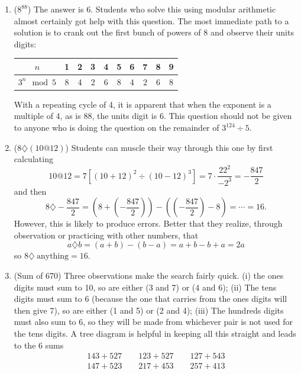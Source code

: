 {\begin{enumerate}
		\item ($8^{88}$) The answer is 6. Students who solve this using modular arithmetic almost certainly got help with this question. The most immediate path to a solution is to crank out the first bunch of powers of 8 and observe their units digits:
		\begin{center}
			\begin{tabular}{|c|c|c|c|c|c|c|c|c|c|}
				\hline
				$n$				& 1 & 2 & 3 & 4 & 5 & 6 & 7 & 8 & 9 \tabularnewline
				\hline
				$3^n \mod 5$ 	& 8 & 4 & 2 & 6 & 8 & 4 & 2 & 6 & 8\tabularnewline
				\hline
			\end{tabular}\par
		\end{center}
		With a repeating cycle of 4, it is apparent that when the exponent is a multiple of 4, as is $88$, the units digit is 6. This question should not be given to anyone who is doing the question on the remainder of $3^{124}\div 5$.
		
		\item ($8\diamondsuit(10@12)$) Students can muscle their way through this one by first calculating
		$$10@12=7[(10+12)^2\div (10-12)^3]=7\cdot\frac{22^2}{-2^3}=-\frac{847}{2}$$
		and then
		$$8\diamondsuit -\frac{847}{2}=\left(8+ \left(-\frac{847}{2}\right)\right)-\left(\left(-\frac{847}{2}\right)-8\right)=\cdots=16.$$
		However, this is likely to produce errors. Better that they realize, through observation or practicing with other numbers, that
		$$a\diamondsuit b=(a+b)-(b-a)=a+b-b+a=2a$$
		so $8\diamondsuit\ \textrm{anything}=16.$
		
		\item (Sum of 670) Three observations make the search fairly quick. (i) the ones digits must sum to 10, so are either (3 and 7) or (4 and 6); (ii) The tens digits must sum to 6 (because the one that carries from the ones digits will then give 7), so are either (1 and 5) or (2 and 4); (iii) The hundreds digits must also sum to 6, so they will be made from whichever pair is not used for the tens digits. A tree diagram is helpful in keeping all this straight and leads to the 6 sums
		$$\begin{gathered}
			143+527\qquad123+527\qquad127+543\\
			147+523\qquad217+453\qquad257+413
		\end{gathered}$$
		

\end{enumerate}}
